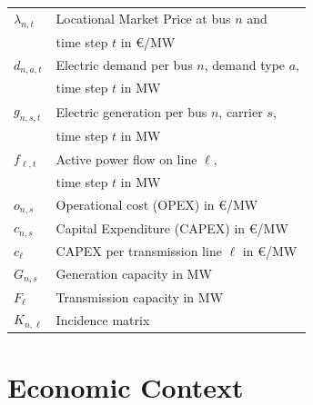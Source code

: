 \documentclass[11pt,twocolumn]{article}
\newcommand{\vpad}{\vspace{1mm}}
\newcommand{\generation}[1][n]{g_{#1,s,t}}
\newcommand{\capacityGeneration}{G_{n,s}}
\newcommand{\capacityFlow}{F_{\ell}}
\newcommand{\capexGeneration}{c_{n,s}}
\newcommand{\capexFlow}{c_{\ell}}
\newcommand{\opexGeneration}[1][n]{o_{#1,s}}
\newcommand{\demand}[1][n]{d_{#1,a,t}}
\newcommand{\incidence}[1][n]{K_{#1,\ell}}
\newcommand{\lmp}[1][n]{\lambda_{#1,t}}
\newcommand{\flow}{f_{\ell,t}}
\begin{document}
\begin{table}[h]
    \centering
    \begin{tabular}{ll}
        $\lmp$ & Locational Market Price at bus $n$ and  \\ & time step $t$ in \euro/MW \vpad \\
        $\demand$ & Electric demand per bus $n$, demand type $a$, \\ & time step $t$ in MW  \vpad \\
        $\generation$ & Electric generation per bus $n$, carrier $s$, \\ & time step $t$  in MW \vpad \\
        $\flow$ & Active power flow on line $\ell$, \\ & time step $t$ in MW   \vpad \\
        $\opexGeneration$ & Operational cost (OPEX) in \euro/MW \vpad \\
        $\capexGeneration$ & Capital Expenditure (CAPEX) in \euro/MW \vpad \\
        $\capexFlow$  & CAPEX per transmission line $\ell$ in \euro/MW  \vpad \\
        $\capacityGeneration$ & Generation capacity in MW \vpad \\
        $\capacityFlow$ & Transmission capacity in MW \vpad \\
        $\incidence$ & Incidence matrix \vpad 
    \end{tabular}
\end{table}

\section{Economic Context}
\end{document}
